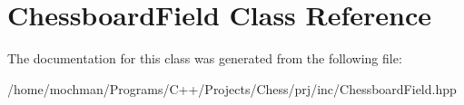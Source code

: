 \hypertarget{class_chessboard_field}{\section{Chessboard\-Field Class Reference}
\label{class_chessboard_field}
}


The documentation for this class was generated from the following file\-:\begin{DoxyCompactItemize}
\item 
/home/mochman/\-Programs/\-C++/\-Projects/\-Chess/prj/inc/Chessboard\-Field.\-hpp\end{DoxyCompactItemize}
